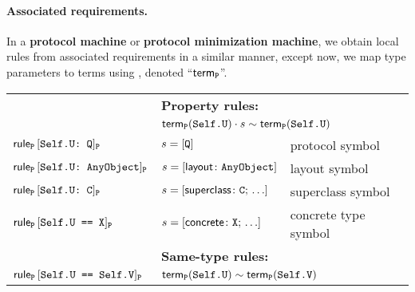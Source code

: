 \documentclass[../generics]{subfiles}
\begin{document}
\paragraph{Associated requirements.}
In a \textbf{protocol machine} or \textbf{protocol minimization machine}, we obtain local rules from associated requirements in a similar manner, except now, we map type parameters to terms using , denoted ``$\mathsf{term}_{\texttt{P}}$''.
\begin{center}
\begin{tabular}{lll}
\toprule
&\textbf{Property rules:}&\\
&\multicolumn{2}{l}{$\mathsf{term}_{\texttt{P}}(\texttt{Self.U}) \cdot s \sim \mathsf{term}_{\texttt{P}}(\texttt{Self.U})$}\\
\midrule
$\mathsf{rule}_{\texttt{P}}\, [\texttt{Self.U:~Q}]_{\texttt{P}}$ & $s = [\texttt{Q}]$&protocol symbol\\
$\mathsf{rule}_{\texttt{P}}\, [\texttt{Self.U:~AnyObject}]_{\texttt{P}}$ & $s = [\mathsf{layout}\colon\texttt{AnyObject}]$&layout symbol\\
$\mathsf{rule}_{\texttt{P}}\, [\texttt{Self.U:~C}]_{\texttt{P}}$ & $s = [\mathsf{superclass}\colon \texttt{C};\,\ldots]$&superclass symbol\\
$\mathsf{rule}_{\texttt{P}}\, [\texttt{Self.U == X}]_{\texttt{P}}$ & $s = [\mathsf{concrete}\colon \texttt{X};\,\ldots]$&concrete type symbol\\
\midrule
&\textbf{Same-type rules:}&\\
$\mathsf{rule}_{\texttt{P}}\, [\texttt{Self.U == Self.V}]_{\texttt{P}}$ & \multicolumn{2}{l}{$\mathsf{term}_{\texttt{P}}(\texttt{Self.U})\sim\mathsf{term}_{\texttt{P}}(\texttt{Self.V})$}\\
\bottomrule
\end{tabular}
\end{center}

\smallskip
\end{document}
